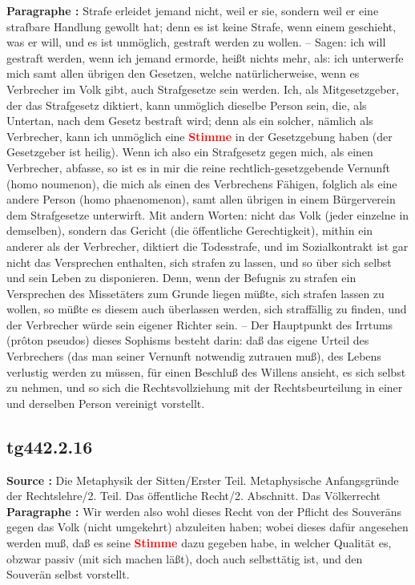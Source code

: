 \documentclass[a4paper,12pt,twoside]{book}
\newcommand{\match}[1]{\textcolor{red}{\textbf{#1}}}
\begin{document}
	\textbf{Paragraphe : }Strafe erleidet jemand nicht, weil er sie, sondern weil er eine strafbare Handlung gewollt hat; denn es ist keine Strafe, wenn einem geschieht, was er will, und es ist unmöglich, gestraft werden zu wollen. – Sagen: ich will gestraft werden, wenn ich jemand ermorde, heißt nichts mehr, als: ich unterwerfe mich samt allen übrigen den Gesetzen, welche natürlicherweise, wenn es Verbrecher im Volk gibt, auch Strafgesetze sein werden. Ich, als Mitgesetzgeber, der das Strafgesetz diktiert, kann unmöglich dieselbe Person sein, die, als Untertan, nach dem Gesetz bestraft wird; denn als ein solcher, nämlich als Verbrecher, kann ich unmöglich eine \match{Stimme} in der Gesetzgebung haben (der Gesetzgeber ist heilig). Wenn ich also ein Strafgesetz gegen mich, als einen Verbrecher, abfasse, so ist es in mir die reine rechtlich-gesetzgebende Vernunft (homo noumenon), die mich als einen des Verbrechens Fähigen, folglich als eine andere Person (homo phaenomenon), samt allen übrigen in einem Bürgerverein dem Strafgesetze unterwirft. Mit andern Worten: nicht das Volk (jeder einzelne in demselben), sondern das Gericht (die öffentliche Gerechtigkeit), mithin ein anderer als der Verbrecher, diktiert die Todesstrafe, und im Sozialkontrakt ist gar nicht das Versprechen enthalten, sich strafen zu lassen, und so über sich selbst und sein Leben zu disponieren. Denn, wenn der Befugnis zu strafen ein Versprechen des Missetäters zum Grunde liegen müßte, sich  strafen lassen zu wollen, so müßte es diesem auch überlassen werden, sich straffällig zu finden, und der Verbrecher würde sein eigener Richter sein. – Der Hauptpunkt des Irrtums (prôton pseudos) dieses Sophisms besteht darin: daß das eigene Urteil des Verbrechers (das man seiner Vernunft notwendig zutrauen muß), des Lebens verlustig werden zu müssen, für einen Beschluß des Willens ansieht, es sich selbst zu nehmen, und so sich die Rechtsvollziehung mit der Rechtsbeurteilung in einer und derselben Person vereinigt vorstellt. 
	
	\subsection*{tg442.2.16} 
	\textbf{Source : }Die Metaphysik der Sitten/Erster Teil. Metaphysische Anfangsgründe der Rechtslehre/2. Teil. Das öffentliche Recht/2. Abschnitt. Das Völkerrecht\\  
	
	\textbf{Paragraphe : }Wir werden also wohl dieses Recht von der Pflicht des Souveräns gegen das Volk (nicht umgekehrt) abzuleiten haben; wobei dieses dafür angesehen werden muß, daß es seine \match{Stimme} dazu gegeben habe, in welcher Qualität es, obzwar passiv (mit sich machen läßt), doch auch selbsttätig ist, und den Souverän selbst vorstellt. 
	
\end{document}
